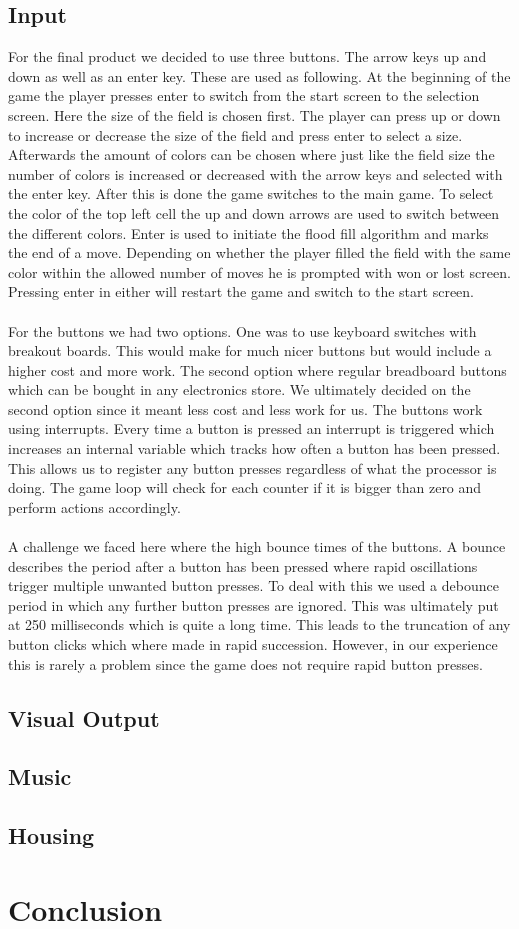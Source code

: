 \documentclass[12pt, a4paper]{article}
\begin{document}
\subsection*{Input}
For the final product we decided to use three buttons. The arrow keys up and down as well as an enter key. These are used as following. At the beginning of the game the player presses enter to switch from the start screen to the selection screen. Here the size of the field is chosen first. The player can press up or down to increase or decrease the size of the field and press enter to select a size. Afterwards the amount of colors can be chosen where just like the field size the number of colors is increased or decreased with the arrow keys and selected with the enter key. After this is done the game switches to the main game. To select the color of the top left cell the up and down arrows are used to switch between the different colors. Enter is used to initiate the flood fill algorithm and marks the end of a move. Depending on whether the player filled the field with the same color within the allowed number of moves he is prompted with won or lost screen. Pressing enter in either will restart the game and switch to the start screen.\\\\
For the buttons we had two options. One was to use keyboard switches with breakout boards. This would make for much nicer buttons but would include a higher cost and more work. The second option where regular breadboard buttons which can be bought in any electronics store. We ultimately decided on the second option since it meant less cost and less work for us. The buttons work using interrupts. Every time a button is pressed an interrupt is triggered which increases an internal variable which tracks how often a button has been pressed. This allows us to register any button presses regardless of what the processor is doing. The game loop will check for each counter if it is bigger than zero and perform actions accordingly.\\\\
A challenge we faced here where the high bounce times of the buttons. A bounce describes the period after a button has been pressed where rapid oscillations trigger multiple unwanted button presses. To deal with this we used a debounce period in which any further button presses are ignored. This was ultimately put at 250 milliseconds which is quite a long time. This leads to the truncation of any button clicks which where made in rapid succession. However, in our experience this is rarely a problem since the game does not require rapid button presses.

\subsection*{Visual Output}

\subsection*{Music}

\subsection*{Housing}

\section*{Conclusion}

\printbibliography
\end{document}
